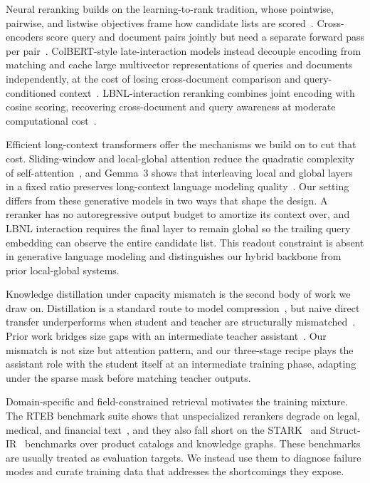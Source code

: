 \documentclass{article}
\begin{document}
Neural reranking builds on the learning-to-rank tradition, whose pointwise, pairwise, and listwise objectives frame how candidate lists are scored~\cite{burges2005learning,li2007mcrank}. Cross-encoders score query and document pairs jointly but need a separate forward pass per pair~\cite{nogueira2019passage,dejean2024thorough}. ColBERT-style late-interaction models instead decouple encoding from matching and cache large multivector representations of queries and documents independently, at the cost of losing cross-document comparison and query-conditioned context~\cite{khattab2020colbert,liu2024analysis,jha2024jina}. LBNL-interaction reranking combines joint encoding with cosine scoring, recovering cross-document and query awareness at moderate computational cost~\cite{wang2025jinarerankerv3}.

Efficient long-context transformers offer the mechanisms we build on to cut that cost. Sliding-window and local-global attention reduce the quadratic complexity of self-attention~\cite{beltagy2020longformer,jiang2023mistral}, and Gemma~3 shows that interleaving local and global layers in a fixed ratio preserves long-context language modeling quality~\cite{gemmateam2025gemma3}. Our setting differs from these generative models in two ways that shape the design. A reranker has no autoregressive output budget to amortize its context over, and LBNL interaction requires the final layer to remain global so the trailing query embedding can observe the entire candidate list. This readout constraint is absent in generative language modeling and distinguishes our hybrid backbone from prior local-global systems.

Knowledge distillation under capacity mismatch is the second body of work we draw on. Distillation is a standard route to model compression~\cite{hinton2015distilling,agarwal2023onpolicy}, but naive direct transfer underperforms when student and teacher are structurally mismatched~\cite{mirzadeh2020improved}. Prior work bridges size gaps with an intermediate teacher assistant~\cite{mirzadeh2020improved}. Our mismatch is not size but attention pattern, and our three-stage recipe plays the assistant role with the student itself at an intermediate training phase, adapting under the sparse mask before matching teacher outputs.

Domain-specific and field-constrained retrieval motivates the training mixture. The RTEB benchmark suite shows that unspecialized rerankers degrade on legal, medical, and financial text~\cite{rteb2025}, and they also fall short on the STARK~\cite{stark} and Struct-IR~\cite{ssrb} benchmarks over product catalogs and knowledge graphs. These benchmarks are usually treated as evaluation targets. We instead use them to diagnose failure modes and curate training data that addresses the shortcomings they expose.
\end{document}
